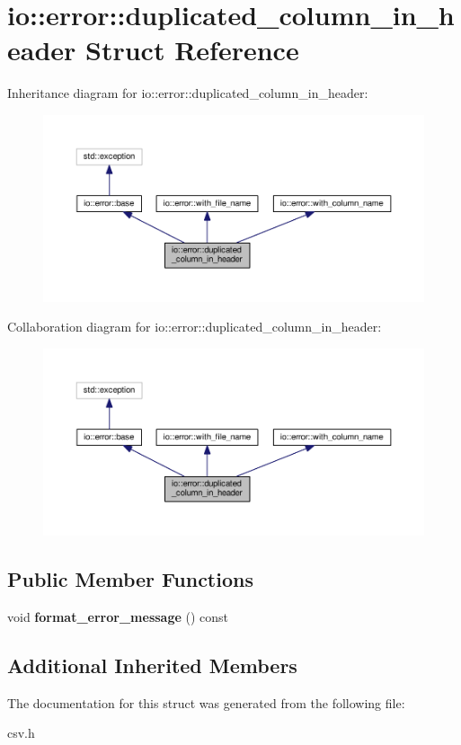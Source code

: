 \section{io\+:\+:error\+:\+:duplicated\+\_\+column\+\_\+in\+\_\+header Struct Reference}
\label{structio_1_1error_1_1duplicated__column__in__header}


Inheritance diagram for io\+:\+:error\+:\+:duplicated\+\_\+column\+\_\+in\+\_\+header\+:\nopagebreak
\begin{figure}[H]
\begin{center}
\leavevmode
\includegraphics[width=350pt]{structio_1_1error_1_1duplicated__column__in__header__inherit__graph}
\end{center}
\end{figure}


Collaboration diagram for io\+:\+:error\+:\+:duplicated\+\_\+column\+\_\+in\+\_\+header\+:\nopagebreak
\begin{figure}[H]
\begin{center}
\leavevmode
\includegraphics[width=350pt]{structio_1_1error_1_1duplicated__column__in__header__coll__graph}
\end{center}
\end{figure}
\subsection*{Public Member Functions}
\begin{DoxyCompactItemize}
\item 
void {\bfseries format\+\_\+error\+\_\+message} () const \label{structio_1_1error_1_1duplicated__column__in__header_aaaae2e6a92ea64017d76cf5972bd8e49}

\end{DoxyCompactItemize}
\subsection*{Additional Inherited Members}


The documentation for this struct was generated from the following file\+:\begin{DoxyCompactItemize}
\item 
csv.\+h\end{DoxyCompactItemize}
